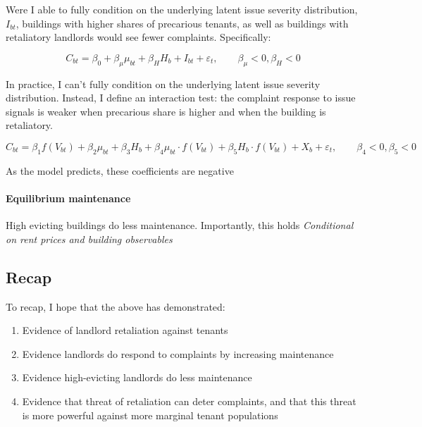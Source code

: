 \documentclass[11pt]{article}
\begin{document}
Were I able to fully condition on the underlying latent issue severity distribution, $I_{bt}$, buildings with higher shares of precarious tenants, as well as buildings with retaliatory landlords would see fewer complaints. Specifically:

\[
C_{bt}=\beta_0 + \beta_\mu \mu_{bt}+ \beta_H H_{b} + I_{bt}+\varepsilon_{t},
\qquad \beta_\mu<0, \beta_H<0
\]

In practice, I can't fully condition on the underlying latent issue severity distribution. Instead, I define an interaction test: the complaint response to issue signals is weaker when precarious share is higher and when the building is retaliatory.

\[
C_{bt}=\beta_1 f(V_{bt})+\beta_2 \mu_{bt}+ \beta_3 H_{b} + \beta_4 \mu_{bt}\cdot f(V_{bt}) +\beta_5 H_{b}\cdot f(V_{bt}) + X_{b} +  \varepsilon_{t},
\qquad \beta_4 < 0, \beta_5 < 0
\]

As the model predicts, these coefficients are negative

\begin{table}[htbp]
\small
\caption{Complaint Suppression: Total Severe Complaints as a Function of Tenant Composition and Issue History (PPML)}
\label{tab:complaint_suppression}

\end{table}
\clearpage
\paragraph{Equilibrium maintenance}

High evicting buildings do less maintenance. Importantly, this holds \emph{Conditional on rent prices and building observables}
\begin{table}[htbp]
\small
\caption{Maintenance Permits in High-Eviction vs.\ Low-Eviction Buildings (PPML)}
\label{tab:maintenance}

\end{table}

\clearpage
\subsection{Recap}

To recap, I hope that the above has demonstrated:

\begin{enumerate}
  \item Evidence of landlord retaliation against tenants
  \item Evidence landlords do respond to complaints by increasing maintenance
  \item Evidence high-evicting landlords do less maintenance
  \item Evidence that threat of retaliation can deter complaints, and that this threat is more powerful against more marginal tenant populations
\end{enumerate}
\end{document}
